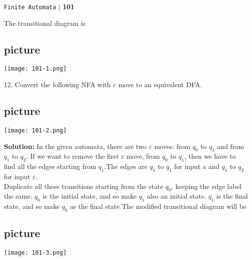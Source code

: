 \documentclass{article}
\begin{document}
\begin{flushright}
 \texttt{Finite Automata} \hspace*{0.1cm}\textbf{$|$} \hspace*{0.1cm} \textbf{101}\hspace*{0.1cm}
\end{flushright}
\vspace*{1.5cm}

\hspace*{0.5cm} The transitional diagram is\\

\vspace*{0.7cm}
\begin{center}
\section{picture}
\texttt{[image: 101-1.png]}
\end{center}

12. Convert the following NFA with $\varepsilon$ move to an equivalent DFA.\\

\vspace*{0.3cm}
\begin{center}
\section{picture}
\texttt{[image: 101-2.png]}
\end{center}

\vspace*{0.3cm}
\textbf{Solution:} In the given automata, there are two $\varepsilon$ moves: from $q_0$ to $q_1$ and from $q_1$ to $q_2$. If we want
to remove the first $\varepsilon$ move, from $q_0$ to $q_1$, then we have to find all the edges starting from $q_1$.The
edges are $q_1$ to $q_1$ for input a and $q_1$ to $q_2$ for input $\varepsilon$.\\

\hspace*{0.5cm} Duplicate all these transitions starting from the state $q_0$, keeping the edge label the same. $q_0$ is
the initial state, and so make $q_1$ also an initial state. $q_1$ is the final state, and so make $q_0$ as the final
state The modified transitional diagram will be\\

\vspace*{0.3cm}
\begin{center}
\section{picture}
\texttt{[image: 101-3.png]}
\end{center}
\end{document}
